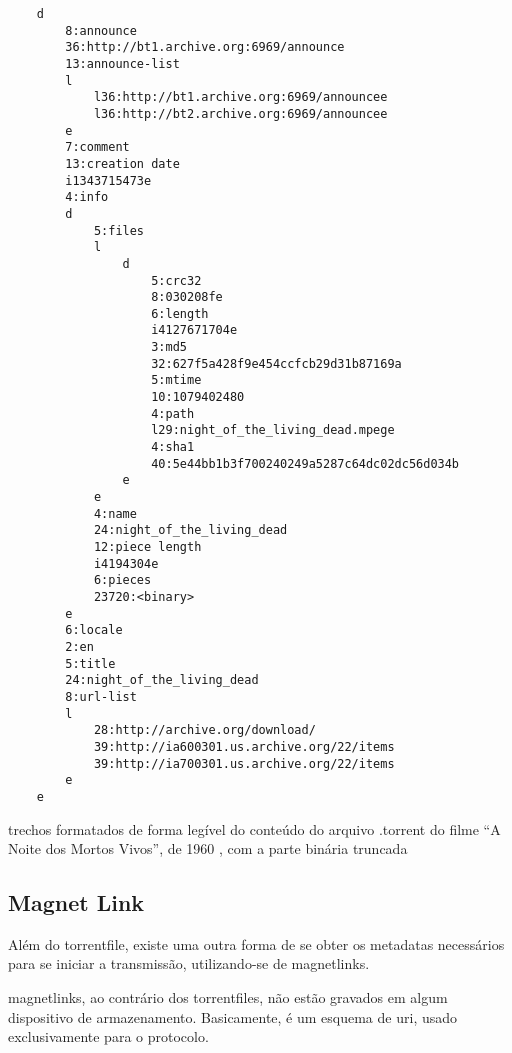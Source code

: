 \begin{listing}[H]
    \begin{verbatim}
    d
        8:announce
        36:http://bt1.archive.org:6969/announce
        13:announce-list
        l
            l36:http://bt1.archive.org:6969/announcee
            l36:http://bt2.archive.org:6969/announcee
        e
        7:comment
        13:creation date
        i1343715473e
        4:info
        d
            5:files
            l
                d
                    5:crc32
                    8:030208fe
                    6:length
                    i4127671704e
                    3:md5
                    32:627f5a428f9e454ccfcb29d31b87169a
                    5:mtime
                    10:1079402480
                    4:path
                    l29:night_of_the_living_dead.mpege
                    4:sha1
                    40:5e44bb1b3f700240249a5287c64dc02dc56d034b
                e
            e
            4:name
            24:night_of_the_living_dead
            12:piece length
            i4194304e
            6:pieces
            23720:<binary>
        e
        6:locale
        2:en
        5:title
        24:night_of_the_living_dead
        8:url-list
        l
            28:http://archive.org/download/
            39:http://ia600301.us.archive.org/22/items
            39:http://ia700301.us.archive.org/22/items
        e
    e
    \end{verbatim}
    \caption{trechos formatados de forma legível do conteúdo do arquivo .torrent do
    filme ``A Noite dos Mortos Vivos'', de 1960 \cite{torrent-file}, com a parte
    binária truncada}
    \label{lst:torrent-file-code}
\end{listing}

\subsection*{Magnet Link}

Além do \gls*{torrentfile}, existe uma outra forma de se obter os \glspl*{metadata}
necessários para se iniciar a transmissão, utilizando-se de \glspl{magnetlink}.

\Glspl*{magnetlink}, ao contrário dos \glspl*{torrentfile}, não estão gravados em
algum dispositivo de armazenamento. Basicamente, é um esquema de \gls{uri}, usado
exclusivamente para o protocolo.

